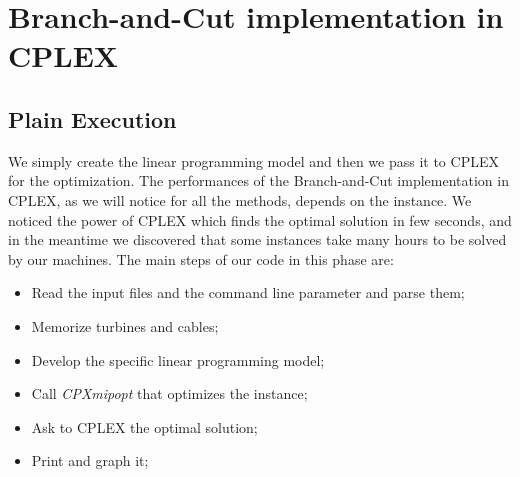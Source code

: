 
\chapter{Branch-and-Cut implementation in CPLEX}

\label{chp:3-CPLEX}

\section{Plain Execution}
We simply create the linear programming model and then we pass it to \textsc{CPLEX} for the optimization. The performances of the Branch-and-Cut implementation in \textsc{CPLEX}, as we will notice for all the methods, depends on the instance. We noticed the power of \textsc{CPLEX} which finds the optimal solution in few seconds, and in the meantime we discovered that some instances take many hours to be solved by our machines. 
The main steps of our code in this phase are: 
\begin{itemize}
\item Read the input files and the command line parameter and parse them;
\item Memorize turbines and cables;
\item Develop the specific linear programming model;
\item Call \textit{CPXmipopt} that optimizes the instance;
\item Ask to \textsc{CPLEX} the optimal solution;
\item Print and graph it;
\end{itemize}

